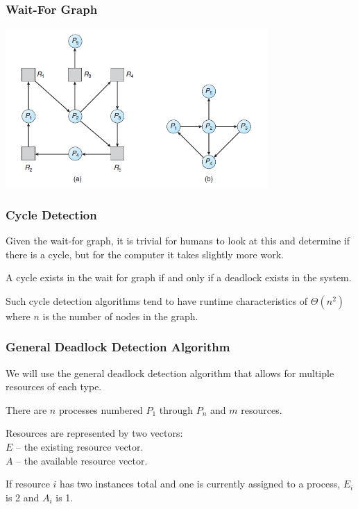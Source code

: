\begin{frame}
\frametitle{Wait-For Graph}

\begin{center}
\includegraphics[width=0.75\textwidth]{images/rag-waitfor.png}
\end{center}

\end{frame}

\begin{frame}
\frametitle{Cycle Detection}

Given the wait-for graph, it is trivial for humans to look at this and determine if there is a cycle, but for the computer it takes slightly more work. 

A cycle exists in the wait for graph if and only if a deadlock exists in the system. 

Such cycle detection algorithms tend to have runtime characteristics of $\Theta(n^{2})$ where $n$ is the number of nodes in the graph. 

\end{frame}

\begin{frame}
\frametitle{General Deadlock Detection Algorithm}

We will use the general deadlock detection algorithm that allows for multiple resources of each type. 

There are $n$ processes numbered $P_{1}$ through $P_{n}$ and $m$ resources. 

Resources are represented by two vectors:\\
\quad $E$ -- the existing resource vector.\\
\quad $A$ -- the available resource vector.

If resource $i$ has two instances total and one is currently assigned to a process, $E_{i}$ is 2 and $A_{i}$ is 1.

\end{frame}

